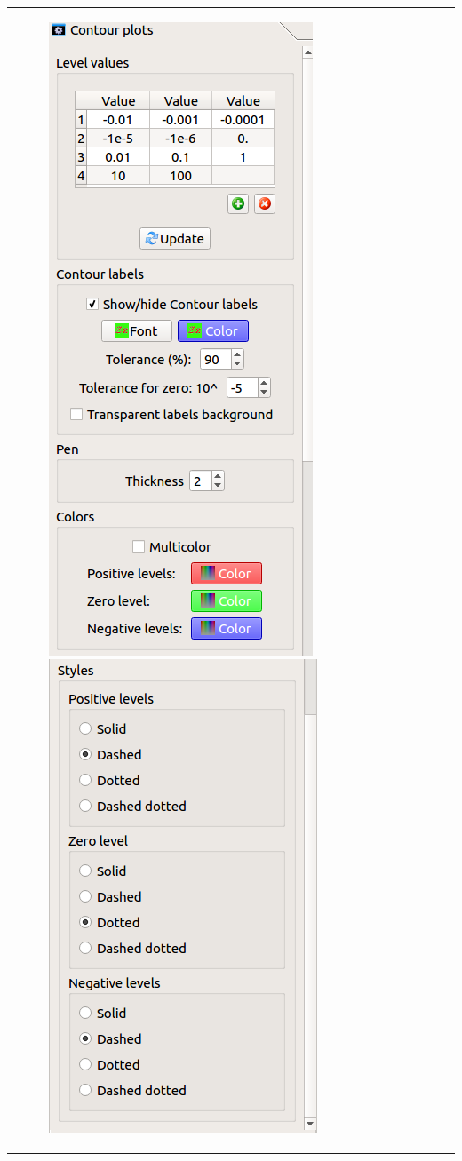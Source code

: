 \documentclass[10pt]{article}
\begin{document}
\begin{tabular}{lr}
\hspace*{-3mm}
\begin{minipage}{.5\linewidth}
\hspace*{-3mm}
\vspace*{4mm}
\begin{figure}[H]
\begin{center}
\vspace*{-5mm}
\includegraphics[width=.5\linewidth]{damqt_fig_3_3a.png}
\includegraphics[width=.5\linewidth]{damqt_fig_3_3b.png}

\end{center}
\end{figure}
\end{minipage}
\end{tabular}
\end{document}
